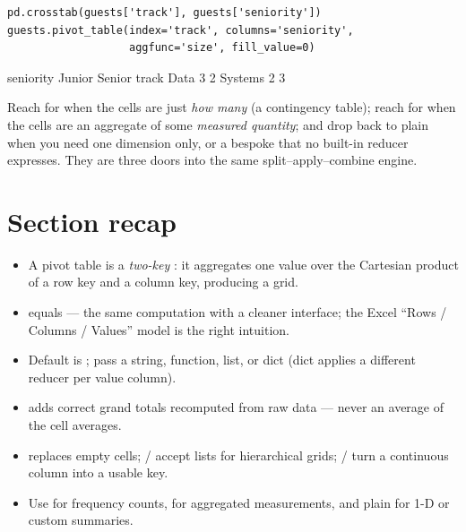 \documentclass[11pt]{article}
\begin{document}
\begin{lstlisting}
pd.crosstab(guests['track'], guests['seniority'])
guests.pivot_table(index='track', columns='seniority',
                   aggfunc='size', fill_value=0)
\end{lstlisting}

\begin{outblock}
seniority  Junior  Senior
track
Data            3       2
Systems         2       3
\end{outblock}

\begin{keyidea}
Reach for  when the cells are just \emph{how many} (a contingency table); reach for  when the cells are an aggregate of some \emph{measured quantity}; and drop back to plain  when you need one dimension only, or a bespoke  that no built-in reducer expresses. They are three doors into the same split--apply--combine engine.
\end{keyidea}

\section*{Section recap}
\begin{itemize}
  \item A pivot table is a \emph{two-key} : it aggregates one value over the Cartesian product of a row key and a column key, producing a grid.
  \item {} equals  --- the same computation with a cleaner interface; the Excel ``Rows / Columns / Values'' model is the right intuition.
  \item Default  is ; pass a string, function, list, or dict (dict applies a different reducer per value column).
  \item {} adds correct grand totals recomputed from raw data --- never an average of the cell averages.
  \item {} replaces empty cells; / accept lists for hierarchical grids; / turn a continuous column into a usable key.
  \item Use  for frequency counts,  for aggregated measurements, and plain  for 1-D or custom summaries.
\end{itemize}
\end{document}
